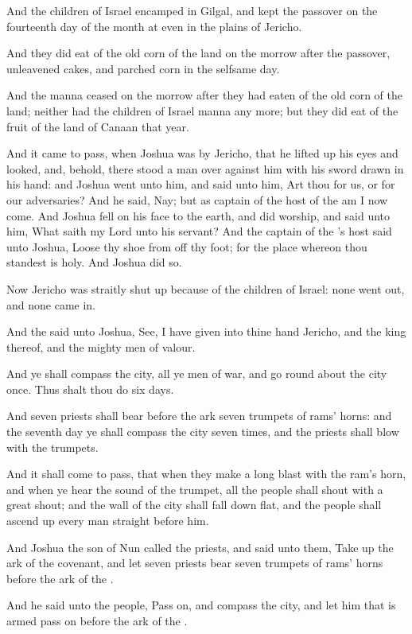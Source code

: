 \Verse And the children of Israel encamped in Gilgal, and kept the passover on the fourteenth day of the month at even in the plains of Jericho.

\Verse And they did eat of the old corn of the land on the morrow after the passover, unleavened cakes, and parched corn in the selfsame day.

\Verse And the manna ceased on the morrow after they had eaten of the old corn of the land; neither had the children of Israel manna any more; but they did eat of the fruit of the land of Canaan that year.

\Verse And it came to pass, when Joshua was by Jericho, that he lifted up his eyes and looked, and, behold, there stood a man over against him with his sword drawn in his hand: and Joshua went unto him, and said unto him, Art thou for us, or for our adversaries?  \Verse And he said, Nay; but as captain of the host of the \LORD am I now come. And Joshua fell on his face to the earth, and did worship, and said unto him, What saith my Lord unto his servant?  \Verse And the captain of the \LORD's host said unto Joshua, Loose thy shoe from off thy foot; for the place whereon thou standest is holy. And Joshua did so.


\Chapter
\Verse Now Jericho was straitly shut up because of the children of Israel: none went out, and none came in.

\Verse And the \LORD said unto Joshua, See, I have given into thine hand Jericho, and the king thereof, and the mighty men of valour.

\Verse And ye shall compass the city, all ye men of war, and go round about the city once. Thus shalt thou do six days.

\Verse And seven priests shall bear before the ark seven trumpets of rams' horns: and the seventh day ye shall compass the city seven times, and the priests shall blow with the trumpets.

\Verse And it shall come to pass, that when they make a long blast with the ram's horn, and when ye hear the sound of the trumpet, all the people shall shout with a great shout; and the wall of the city shall fall down flat, and the people shall ascend up every man straight before him.

\Verse And Joshua the son of Nun called the priests, and said unto them, Take up the ark of the covenant, and let seven priests bear seven trumpets of rams' horns before the ark of the \LORD.

\Verse And he said unto the people, Pass on, and compass the city, and let him that is armed pass on before the ark of the \LORD.

